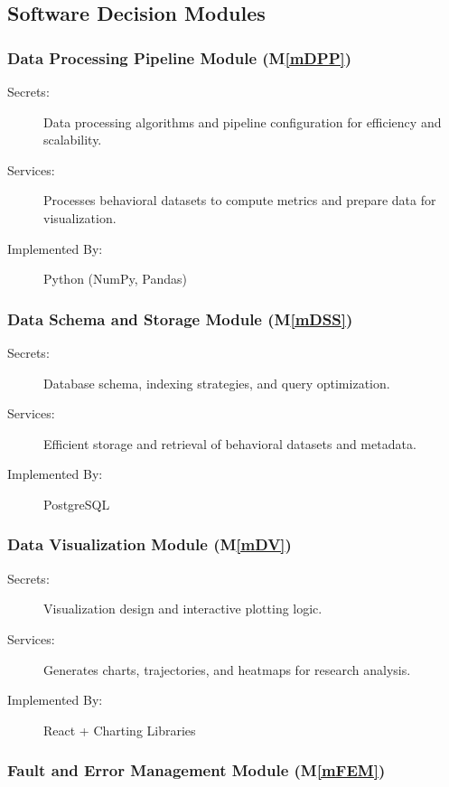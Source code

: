 \documentclass[12pt, titlepage]{article}
\newcommand{\mref}[1]{M\ref{#1}}
\begin{document}
\subsection{Software Decision Modules}

\subsubsection{Data Processing Pipeline Module (\mref{mDPP})}

\begin{description}
\item[Secrets:] Data processing algorithms and pipeline configuration for efficiency and scalability.
\item[Services:] Processes behavioral datasets to compute metrics and prepare data for visualization.
\item[Implemented By:] Python (NumPy, Pandas)
\end{description}

\subsubsection{Data Schema and Storage Module (\mref{mDSS})}

\begin{description}
\item[Secrets:] Database schema, indexing strategies, and query optimization.
\item[Services:] Efficient storage and retrieval of behavioral datasets and metadata.
\item[Implemented By:] PostgreSQL
\end{description}

\subsubsection{Data Visualization Module (\mref{mDV})}

\begin{description}
\item[Secrets:] Visualization design and interactive plotting logic.
\item[Services:] Generates charts, trajectories, and heatmaps for research analysis.
\item[Implemented By:] React + Charting Libraries
\end{description}

\subsubsection{Fault and Error Management Module (\mref{mFEM})}
\end{document}
